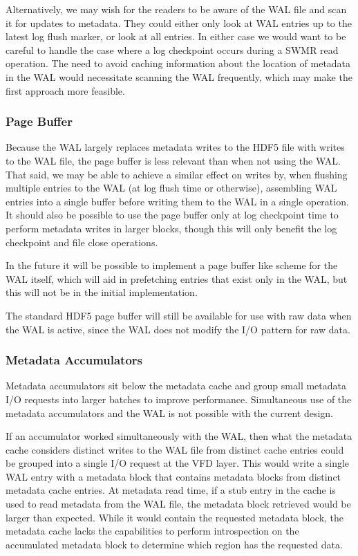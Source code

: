 Alternatively, we may wish for the readers to be aware of the WAL file and scan it for updates to metadata. They could either only look at WAL entries up to the latest log flush marker, or look at all entries. In either case we would want to be careful to handle the case where a log checkpoint occurs during a SWMR read operation. The need to avoid caching information about the location of metadata in the WAL would necessitate scanning the WAL frequently, which may make the first approach more feasible.

\subsubsection{Page Buffer}

Because the WAL largely replaces metadata writes to the HDF5 file with writes to the WAL file, the page buffer is less relevant than when not using the WAL. That said, we may be able to achieve a similar effect on writes by, when flushing multiple entries to the WAL (at log flush time or otherwise), assembling WAL entries into a single buffer before writing them to the WAL in a single operation. It should also be possible to use the page buffer only at log checkpoint time to perform metadata writes in larger blocks, though this will only benefit the log checkpoint and file close operations.

In the future it will be possible to implement a page buffer like scheme for the WAL itself, which will aid in prefetching entries that exist only in the WAL, but this will not be in the initial implementation.

The standard HDF5 page buffer will still be available for use with raw data when the WAL is active, since the WAL does not modify the I/O pattern for raw data.

\subsubsection{Metadata Accumulators}

Metadata accumulators sit below the metadata cache and group small metadata I/O requests into larger batches to improve performance. Simultaneous use of the metadata accumulators and the WAL is not possible with the current design.

If an accumulator worked simultaneously with the WAL, then what the metadata cache considers distinct writes to the WAL file from distinct cache entries could be grouped into a single I/O request at the VFD layer. This would write a single WAL entry with a metadata block that contains metadata blocks from distinct metadata cache entries. At metadata read time, if a stub entry in the cache is used to read metadata from the WAL file, the metadata block retrieved would be larger than expected. While it would contain the requested metadata block, the metadata cache lacks the capabilities to perform introspection on the accumulated metadata block to determine which region has the requested data. 

